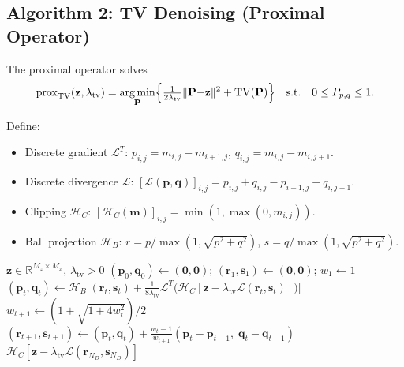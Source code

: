 \documentclass[11pt,a4paper]{article}
\newcommand{\R}{\mathbb{R}}
\newcommand{\TV}{\mathrm{TV}}
\DeclareMathOperator*{\argmin}{arg\,min}
\begin{document}
\subsection{Algorithm 2: TV Denoising (Proximal Operator)}

The proximal operator solves
\begin{equation}
  \mathrm{prox}_{\TV}(\mathbf{z},\lambda_{\mathrm{tv}})
  =\argmin_{\mathbf{P}}\Bigl\{
  \tfrac{1}{2\lambda_{\mathrm{tv}}}
  \|\mathbf{P}{-}\mathbf{z}\|^2
  +\TV(\mathbf{P})\Bigr\}
  \quad\text{s.t.}\quad 0\le P_{p,q}\le 1.
  \label{eq:prox}
\end{equation}

Define:
\begin{itemize}
  \item Discrete gradient $\mathcal{L}^T$:
    $p_{i,j}=m_{i,j}{-}m_{i+1,j}$,\;
    $q_{i,j}=m_{i,j}{-}m_{i,j+1}$.
  \item Discrete divergence $\mathcal{L}$:
    $[\mathcal{L}(\mathbf{p},\mathbf{q})]_{i,j}
    =p_{i,j}{+}q_{i,j}{-}p_{i-1,j}{-}q_{i,j-1}$.
  \item Clipping $\mathcal{H}_C$:
    $[\mathcal{H}_C(\mathbf{m})]_{i,j}
    =\min(1,\max(0,m_{i,j}))$.
  \item Ball projection $\mathcal{H}_B$:
    $r=p/\max(1,\sqrt{p^2{+}q^2})$,\;
    $s=q/\max(1,\sqrt{p^2{+}q^2})$.
\end{itemize}

\begin{algorithm}[H]
\caption{TV denoising:
$\mathrm{prox}_{\TV}(\mathbf{z},\lambda_{\mathrm{tv}})$}
\label{alg:tv}
\begin{algorithmic}[1]
\Require $\mathbf{z}\in\R^{M_z\times M_x}$,
$\lambda_{\mathrm{tv}}>0$
\State $(\mathbf{p}_0,\mathbf{q}_0)\leftarrow(\mathbf{0},\mathbf{0})$;\;
$(\mathbf{r}_1,\mathbf{s}_1)\leftarrow(\mathbf{0},\mathbf{0})$;\;
$w_1\leftarrow 1$
  \State $(\mathbf{p}_t,\mathbf{q}_t)\leftarrow
    \mathcal{H}_B\!\bigl[(\mathbf{r}_t,\mathbf{s}_t)
    +\tfrac{1}{8\lambda_{\mathrm{tv}}}\mathcal{L}^T\!\bigl(
    \mathcal{H}_C[\mathbf{z}{-}\lambda_{\mathrm{tv}}
    \mathcal{L}(\mathbf{r}_t,\mathbf{s}_t)]\bigr)\bigr]$
  \State $w_{t+1}\leftarrow(1{+}\sqrt{1{+}4w_t^2})/2$
  \State $(\mathbf{r}_{t+1},\mathbf{s}_{t+1})\leftarrow
    (\mathbf{p}_t,\mathbf{q}_t)
    +\tfrac{w_t{-}1}{w_{t+1}}
    (\mathbf{p}_t{-}\mathbf{p}_{t-1},\;
    \mathbf{q}_t{-}\mathbf{q}_{t-1})$
\EndFor
\State \Return
$\mathcal{H}_C[\mathbf{z}{-}\lambda_{\mathrm{tv}}
\mathcal{L}(\mathbf{r}_{N_D},\mathbf{s}_{N_D})]$
\end{algorithmic}
\end{algorithm}
\end{document}
